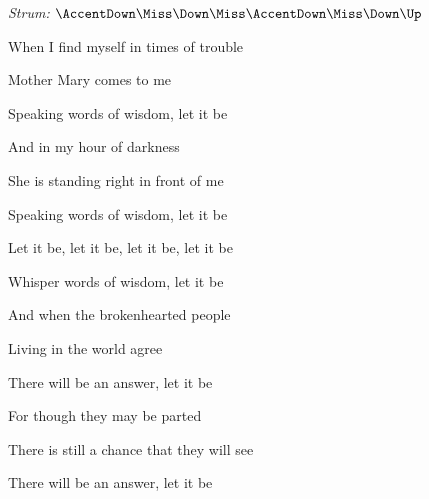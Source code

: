 \begin{song}


\begin{headerbox}
\RaiseBoxWithAccents
\textit{Strum:} $\AccentDown\Miss\Down\Miss\AccentDown\Miss\Down\Up$
\end{headerbox}

\begin{vchordbox}
\end{vchordbox}

\Large

\bigskip

When I find myself in times of trouble \par
{}Mother Mary comes to me \par
{}Speaking words of wisdom, let it be    \par

\bigskip

And in my hour of darkness \par
She is standing right in front of me \par
{}Speaking words of wisdom, let it be    \par

\bigskip

Let it be, let it be, let it be, let it be \par
{}Whisper words of wisdom, let it be    \par

\bigskip

And when the brokenhearted people \par
{}Living in the world agree \par
{}There will be an answer, let it be    \par

\bigskip

For though they may be parted \par
There is still a chance that they will see \par
{}There will be an answer, let it be    \par


\end{song}
